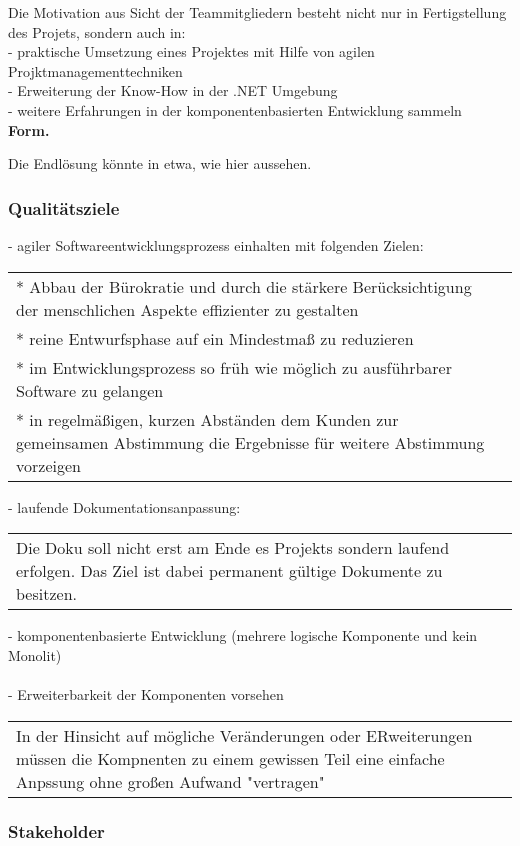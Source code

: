 \documentclass[12pt,a4paper,bibliography=totocnumbered,listof=totocnumbered]{scrartcl}
\begin{document}
Die Motivation aus Sicht der Teammitgliedern besteht nicht nur in Fertigstellung des Projets, sondern auch in: \\
- praktische Umsetzung eines Projektes mit Hilfe von agilen Projktmanagementtechniken \\
- Erweiterung der Know-How in der .NET Umgebung \\
- weitere Erfahrungen in der komponentenbasierten Entwicklung sammeln \\
\textbf{Form.}

Die Endlösung könnte in etwa, wie hier aussehen.
\subsubsection{Qualitätsziele}
- agiler Softwareentwicklungsprozess einhalten mit folgenden Zielen: \\
\begin{tabular}[t]{lr} 
* Abbau der Bürokratie und durch die stärkere Berücksichtigung der menschlichen Aspekte effizienter zu gestalten \\
* reine Entwurfsphase auf ein Mindestmaß zu reduzieren \\
* im Entwicklungsprozess so früh wie möglich zu ausführbarer Software zu gelangen \\
* in regelmäßigen, kurzen Abständen dem Kunden zur gemeinsamen Abstimmung die Ergebnisse für weitere Abstimmung vorzeigen \\
\end{tabular}

- laufende Dokumentationsanpassung: \\
\begin{tabular}[t]{lr} 
Die Doku soll nicht erst am Ende es Projekts sondern laufend erfolgen. Das Ziel ist dabei permanent gültige Dokumente zu besitzen.
\end{tabular}

- komponentenbasierte Entwicklung (mehrere logische Komponente und kein Monolit) \\
\\
- Erweiterbarkeit der Komponenten vorsehen \\
\begin{tabular}[t]{lr} 
In der Hinsicht auf mögliche Veränderungen oder ERweiterungen müssen die Kompnenten zu einem gewissen Teil eine einfache Anpssung ohne großen Aufwand "vertragen"
\end{tabular}

\subsubsection{Stakeholder}
\end{document}
